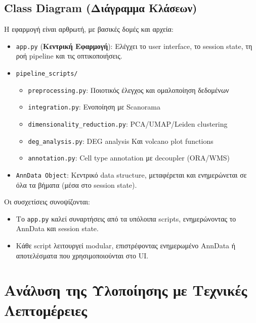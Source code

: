 \documentclass[12pt, a4paper]{article}
\begin{document}
\subsection{Class Diagram (Διάγραμμα Κλάσεων)}
Η εφαρμογή είναι αρθρωτή, με βασικές δομές και αρχεία:
\begin{itemize}
    \item \texttt{app.py} (\textbf{Κεντρική Εφαρμογή}): Ελέγχει το user interface, το session state, τη ροή pipeline και τις οπτικοποιήσεις.
    \item \texttt{pipeline\_scripts/}
    \begin{itemize}
        \item \texttt{preprocessing.py}: Ποιοτικός έλεγχος και ομαλοποίηση δεδομένων
        \item \texttt{integration.py}: Ενοποίηση με Scanorama
        \item \texttt{dimensionality\_reduction.py}: PCA/UMAP/Leiden clustering
        \item \texttt{deg\_analysis.py}: DEG analysis Και volcano plot functions
        \item \texttt{annotation.py}: Cell type annotation με decoupler (ORA/WMS)
    \end{itemize}
    \item \texttt{AnnData Object}: Κεντρικό data structure, μεταφέρεται και ενημερώνεται σε όλα τα βήματα (μέσα στο session state).
\end{itemize}

Οι συσχετίσεις συνοψίζονται:
\begin{itemize}
    \item Το \texttt{app.py} καλεί συναρτήσεις από τα υπόλοιπα scripts, ενημερώνοντας το AnnData και session state.
    \item Κάθε script λειτουργεί modular, επιστρέφοντας ενημερωμένο AnnData ή αποτελέσματα που χρησιμοποιούνται στο UI.
\end{itemize}


\newpage

\section{Ανάλυση της Υλοποίησης με Τεχνικές Λεπτομέρειες}
\label{sec:analysis_implementation}
\end{document}
